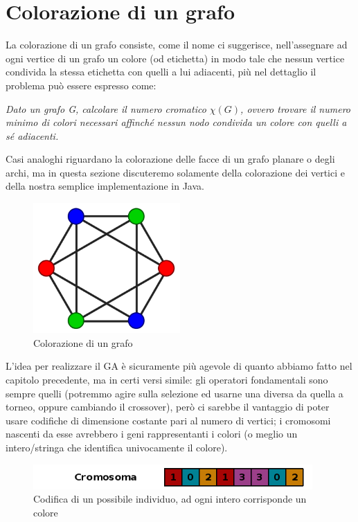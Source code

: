 \section{Colorazione di un grafo}
La colorazione di un grafo consiste, come il nome ci suggerisce, nell'assegnare ad ogni vertice di un grafo un colore (od etichetta) in modo tale che nessun vertice condivida la stessa etichetta con quelli a lui adiacenti, pi\`u nel dettaglio il problema pu\`o essere espresso come:
\vspace{3mm}

\textit{Dato un grafo G, calcolare il \textit{numero cromatico} $\chi(G)$, ovvero trovare il numero minimo di colori necessari affinch\'e nessun nodo condivida un colore con quelli a s\'e adiacenti.}
\vspace{3mm}

Casi analoghi riguardano la colorazione delle facce di un grafo planare o degli archi, ma in questa sezione discuteremo solamente della colorazione dei vertici e della nostra semplice implementazione in Java.
\vspace{3mm}
\begin{figure}[H]
    \centering
    \hfill
    \includegraphics[width=0.5\textwidth]{Images/graphColoring.png}
    \hspace*{\fill}
    \caption{Colorazione di un grafo}
    \label{fig:graphColoring}
\end{figure}
L'idea per realizzare il GA \`e sicuramente pi\`u agevole di quanto abbiamo fatto nel capitolo precedente, ma in certi versi simile: gli operatori fondamentali sono sempre quelli (potremmo agire sulla selezione ed usarne una diversa da quella a torneo, oppure cambiando il crossover), per\`o ci sarebbe il vantaggio di poter usare codifiche di dimensione costante pari al numero di vertici; i cromosomi nascenti da esse avrebbero i geni rappresentanti i colori (o meglio un intero/stringa che identifica univocamente il colore).
\begin{figure}[H]
    \centering
    \hfill
    \includegraphics[width=0.95\textwidth]{Images/coloring.png}
    \hspace*{\fill}
    \caption{Codifica di un possibile individuo, ad ogni intero corrisponde un colore}
    \label{fig:coloring}
\end{figure}
